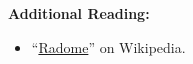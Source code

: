 

{\bf Additional Reading:}
\begin{itemize}
\item ``\href{https://en.wikipedia.org/wiki/Radome}{Radome}'' on Wikipedia.
\end{itemize}



